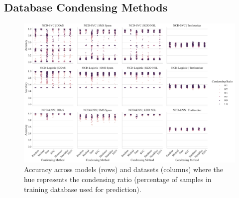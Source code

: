 \documentclass[conference]{IEEEtran}
\begin{document}
\subsection{Database Condensing Methods}

\begin{figure}[htb]
    \centering
    \includegraphics[width=\textwidth]{figs/combined/condensing_ratio_vs_accuracy.pdf}
    \caption{Accuracy across models (rows) and datasets (columns) where the hue represents the condensing ratio (percentage of samples in training database used for prediction). }
    \label{fig:condense_acc_ratios}
\end{figure}
\end{document}
